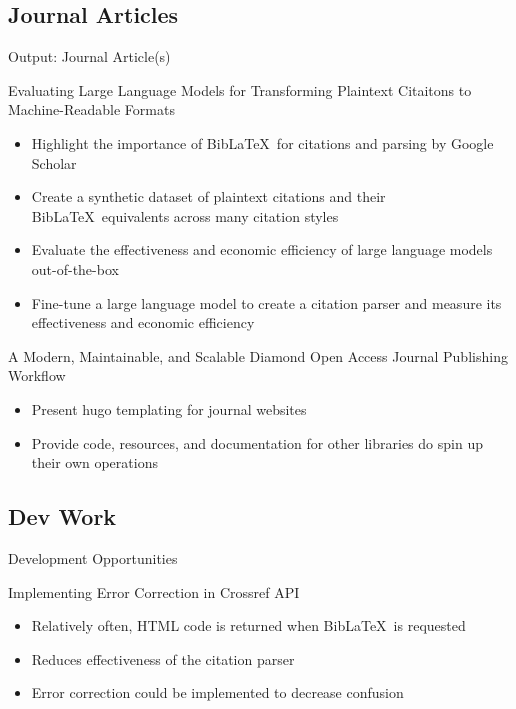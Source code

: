 \documentclass[aspectratio=169,9pt,xcolor=dvipsnames]{beamer}
\begin{document}
\subsection{Journal Articles}
\begin{frame}{Output: Journal Article(s)}
    \begin{block}{Evaluating Large Language Models for Transforming Plaintext Citaitons to Machine-Readable Formats}
        \begin{itemize}
            \item Highlight the importance of Bib\LaTeX\ for citations and parsing by Google Scholar
            \item Create a synthetic dataset of plaintext citations and their Bib\LaTeX\ equivalents across many citation styles
            \item Evaluate the effectiveness and economic efficiency of large language models out-of-the-box
            \item Fine-tune a large language model to create a citation parser and measure its effectiveness and economic efficiency
        \end{itemize}
    \end{block}
    \begin{block}{A Modern, Maintainable, and Scalable Diamond Open Access Journal Publishing Workflow}
        \begin{itemize}
            \item Present hugo templating for journal websites
            \item Provide code, resources, and documentation for other libraries do spin up their own operations
        \end{itemize}
        
    \end{block}
\end{frame}

\subsection{Dev Work}
\begin{frame}{Development Opportunities}
    \begin{block}{Implementing Error Correction in Crossref API}
        \begin{itemize}
            \item Relatively often, HTML code is returned when Bib\LaTeX\ is requested
            \item Reduces effectiveness of the citation parser
            \item Error correction could be implemented to decrease confusion
        \end{itemize}
    \end{block}
\end{frame}
\end{document}
